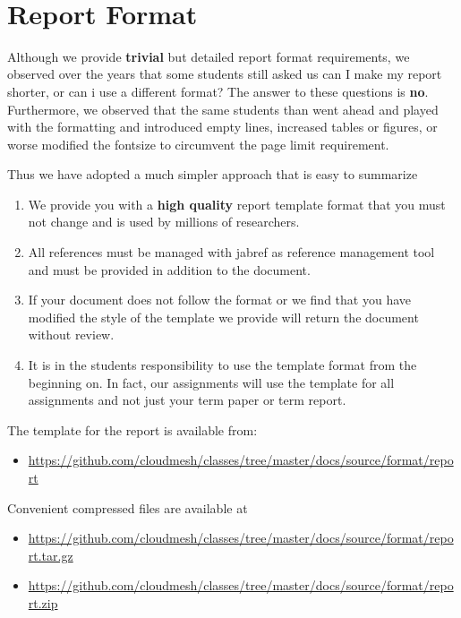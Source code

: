 \FILENAME\

\section{Report Format}\label{report-format}

Although we provide \textbf{trivial} but detailed report format
requirements, we observed over the years that some students still asked
us can I make my report shorter, or can i use a different format? The
answer to these questions is \textbf{no}. Furthermore, we observed that
the same students than went ahead and played with the formatting and
introduced empty lines, increased tables or figures, or worse modified
the fontsize to circumvent the page limit requirement.

Thus we have adopted a much simpler approach that is easy to summarize

\begin{enumerate}
\def\labelenumi{\arabic{enumi}.}

\item
  We provide you with a \textbf{high quality} report template format
  that you must not change and is used by millions of researchers.
\item
  All references must be managed with jabref as reference management
  tool and must be provided in addition to the document.
\item
  If your document does not follow the format or we find that you have
  modified the style of the template we provide will return the document
  without review.
\item
  It is in the students responsibility to use the template format from
  the beginning on. In fact, our assignments will use the template for
  all assignments and not just your term paper or term report.
\end{enumerate}

The template for the report is available from:

\begin{itemize}

\item
  \url{https://github.com/cloudmesh/classes/tree/master/docs/source/format/report}
\end{itemize}

Convenient compressed files are available at

\begin{itemize}

\item
  \url{https://github.com/cloudmesh/classes/tree/master/docs/source/format/report.tar.gz}
\item
  \url{https://github.com/cloudmesh/classes/tree/master/docs/source/format/report.zip}
\end{itemize}

